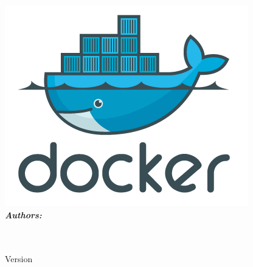 \begin{titlepage}
	\includegraphics[scale = 0.5]{images/docker.png}\\[1.0 cm]	%
	
	\textbf{\large\emph\textbf{Authors:}}\\
	\theauthor
		
	~\\[0.8cm]	
	{\large \thedate}\\[0.25cm]
		Version \VersionNumber \\
		\renewcommand{\headrulewidth}{0pt}
	\vfill

	
\end{titlepage}